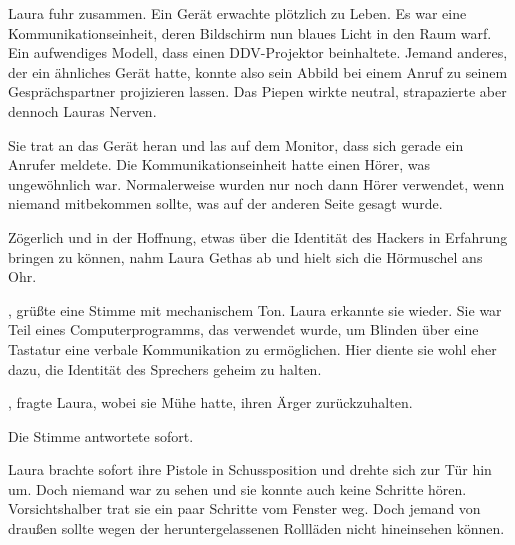 \par

Laura fuhr zusammen. Ein Gerät erwachte plötzlich zu Leben. Es war eine Kommunikationseinheit, deren Bildschirm nun blaues Licht in den Raum warf. Ein aufwendiges Modell, dass einen DDV-Projektor beinhaltete. Jemand anderes, der ein ähnliches Gerät hatte, konnte also sein Abbild bei einem Anruf zu seinem Gesprächspartner projizieren lassen. Das Piepen wirkte neutral, strapazierte aber dennoch Lauras Nerven.

\par

Sie trat an das Gerät heran und las auf dem Monitor, dass sich gerade ein Anrufer meldete. Die Kommunikationseinheit hatte einen Hörer, was ungewöhnlich war. Normalerweise wurden nur noch dann Hörer verwendet, wenn niemand mitbekommen sollte, was auf der anderen Seite gesagt wurde.

\par

Zögerlich und in der Hoffnung, etwas über die Identität des Hackers in Erfahrung bringen zu können, nahm Laura Gethas ab und hielt sich die Hörmuschel ans Ohr.

\par

, grüßte eine Stimme mit mechanischem Ton. Laura erkannte sie wieder. Sie war Teil eines Computerprogramms, das verwendet wurde, um Blinden über eine Tastatur eine verbale Kommunikation zu ermöglichen. Hier diente sie wohl eher dazu, die Identität des Sprechers geheim zu halten.

\par

, fragte Laura, wobei sie Mühe hatte, ihren Ärger zurückzuhalten.

\par

Die Stimme antwortete sofort. 

\par

Laura brachte sofort ihre Pistole in Schussposition und drehte sich zur Tür hin um. Doch niemand war zu sehen und sie konnte auch keine Schritte hören. Vorsichtshalber trat sie ein paar Schritte vom Fenster weg. Doch jemand von draußen sollte wegen der heruntergelassenen Rollläden nicht hineinsehen können.

\par

